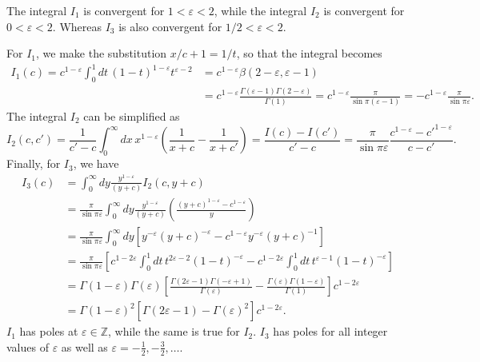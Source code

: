 \begin{solution}
    The integral $I_1$ is convergent for $1<\varepsilon<2$, while the integral $I_2$ is convergent for $0<\varepsilon<2$. Whereas $I_3$ is also convergent for $1/2<\varepsilon<2$.

    For $I_1$, we make the substitution $x/c+1 = 1/t$, so that the integral becomes
    \begin{equation}
    \begin{aligned}
        I_1(c) = c^{1-\varepsilon}\int^1_0dt\,(1-t)^{1-\varepsilon}t^{\varepsilon-2} &= c^{1-\varepsilon}\beta(2-\varepsilon,\varepsilon-1) \\
        &= c^{1-\varepsilon}\frac{\Gamma(\varepsilon-1)\Gamma(2-\varepsilon)}{\Gamma(1)} = c^{1-\varepsilon}\frac{\pi}{\sin\pi(\varepsilon-1)} = - c^{1-\varepsilon}\frac{\pi}{\sin\pi\varepsilon}.
    \end{aligned}
    \end{equation}
     The integral $I_2$ can be simplified as
     \begin{equation}
         I_2(c,c') = \frac{1}{c'-c}\int_0^\infty dx\, x^{1-\varepsilon}\left(\frac{1}{x+c}-\frac{1}{x+c'}\right) = \frac{I(c) - I(c')}{c'-c} = \frac{\pi}{\sin\pi\varepsilon}\frac{c^{1-\varepsilon} - c'^{1-\varepsilon}}{c-c'}.
     \end{equation}
     Finally, for $I_3$, we have
     \begin{equation}
     \begin{aligned}
          I_3(c) &= \int^\infty_0 dy\frac{y^{1-\varepsilon}}{(y+c)}I_2(c,y+c) \\
          &= \frac{\pi}{\sin\pi\varepsilon}\int^\infty_0 dy\frac{y^{1-\varepsilon}}{(y+c)}\left(\frac{(y+c)^{1-\varepsilon}-c^{1-\varepsilon}}{y}\right)\\
          &=\frac{\pi}{\sin\pi\varepsilon}\int^\infty_0 dy \left[y^{-\varepsilon}(y+c)^{-\varepsilon} - c^{1-\varepsilon}y^{-\varepsilon}(y+c)^{-1}\right]\\
          &=\frac{\pi}{\sin\pi\varepsilon}\left[c^{1-2\varepsilon}\int^1_0 dt \, t^{2\varepsilon-2}(1-t)^{-\varepsilon} - c^{1-2\varepsilon}\int^1_0 dt \,t^{\varepsilon-1}(1-t)^{-\varepsilon}\right]\\
          &=\Gamma(1-\varepsilon)\Gamma(\varepsilon)\left[\frac{\Gamma(2\varepsilon-1)\Gamma(-\varepsilon+1)}{\Gamma(\varepsilon)} - \frac{\Gamma(\varepsilon)\Gamma(1-\varepsilon)}{\Gamma(1)}\right]c^{1-2\varepsilon}\\
          &=\Gamma(1-\varepsilon)^2\left[\Gamma(2\varepsilon-1)-\Gamma(\varepsilon)^2\right]c^{1-2\varepsilon}.
     \end{aligned}
     \end{equation}
     $I_1$ has poles at $\varepsilon\in \mathbb{Z}$, while the same is true for $I_2$. $I_3$ has poles for all integer values of $\varepsilon$ as well as $\varepsilon = -\frac{1}{2}, -\frac{3}{2},\dots$.


\end{solution}

